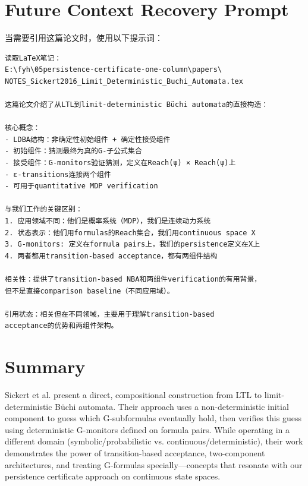 \documentclass{article}
\begin{document}
\section{Future Context Recovery Prompt}

当需要引用这篇论文时，使用以下提示词：

\begin{verbatim}
读取LaTeX笔记：
E:\fyh\05persistence-certificate-one-column\papers\
NOTES_Sickert2016_Limit_Deterministic_Buchi_Automata.tex

这篇论文介绍了从LTL到limit-deterministic Büchi automata的直接构造：

核心概念：
- LDBA结构：非确定性初始组件 + 确定性接受组件
- 初始组件：猜测最终为真的G-子公式集合
- 接受组件：G-monitors验证猜测，定义在Reach(ψ) × Reach(ψ)上
- ε-transitions连接两个组件
- 可用于quantitative MDP verification

与我们工作的关键区别：
1. 应用领域不同：他们是概率系统（MDP），我们是连续动力系统
2. 状态表示：他们用formulas的Reach集合，我们用continuous space X
3. G-monitors: 定义在formula pairs上，我们的persistence定义在X上
4. 两者都用transition-based acceptance，都有两组件结构

相关性：提供了transition-based NBA和两组件verification的有用背景，
但不是直接comparison baseline（不同应用域）。

引用状态：相关但在不同领域，主要用于理解transition-based
acceptance的优势和两组件架构。
\end{verbatim}

\section{Summary}

Sickert et al. present a direct, compositional construction from LTL to limit-deterministic Büchi automata. Their approach uses a non-deterministic initial component to guess which G-subformulas eventually hold, then verifies this guess using deterministic G-monitors defined on formula pairs. While operating in a different domain (symbolic/probabilistic vs. continuous/deterministic), their work demonstrates the power of transition-based acceptance, two-component architectures, and treating G-formulas specially—concepts that resonate with our persistence certificate approach on continuous state spaces.
\end{document}
